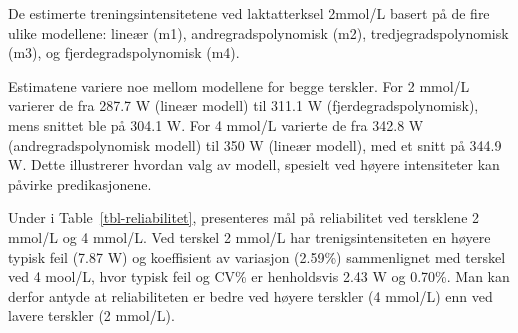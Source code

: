 \documentclass[
  letterpaper,
  DIV=11,
  numbers=noendperiod]{scrreprt}
\begin{document}
\begin{table}

\caption{\label{tbl-4mmol}De estimerte treningsintensitetene ved
laktatterksel 2mmol/L basert på de fire ulike modellene: lineær (m1),
andregradspolynomisk (m2), tredjegradspolynomisk (m3), og
fjerdegradspolynomisk (m4).}


\end{table}%

Estimatene variere noe mellom modellene for begge terskler. For 2 mmol/L
varierer de fra 287.7 W (lineær modell) til 311.1 W
(fjerdegradspolynomisk), mens snittet ble på 304.1 W. For 4 mmol/L
varierte de fra 342.8 W (andregradspolynomisk modell) til 350 W (lineær
modell), med et snitt på 344.9 W. Dette illustrerer hvordan valg av
modell, spesielt ved høyere intensiteter kan påvirke predikasjonene.

Under i Table~\ref{tbl-reliabilitet}, presenteres mål på reliabilitet
ved tersklene 2 mmol/L og 4 mmol/L. Ved terskel 2 mmol/L har
trenigsintensiteten en høyere typisk feil (7.87 W) og koeffisient av
variasjon (2.59\%) sammenlignet med terskel ved 4 mool/L, hvor typisk
feil og CV\% er henholdsvis 2.43 W og 0.70\%. Man kan derfor antyde at
reliabiliteten er bedre ved høyere terskler (4 mmol/L) enn ved lavere
terskler (2 mmol/L).
\end{document}
